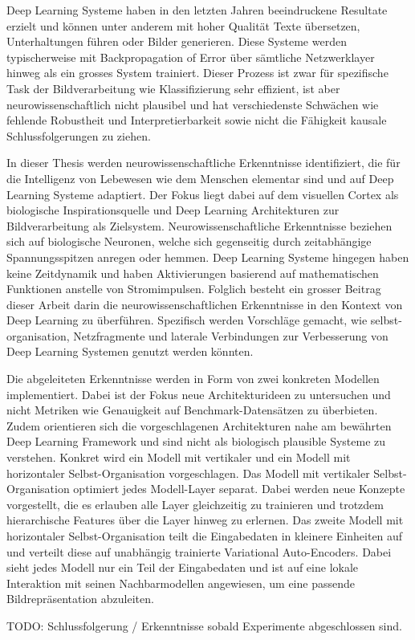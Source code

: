 Deep Learning Systeme haben in den letzten Jahren beeindruckene Resultate erzielt und können unter anderem mit hoher Qualität Texte übersetzen, Unterhaltungen führen oder Bilder generieren. Diese Systeme werden typischerweise mit Backpropagation of Error über sämtliche Netzwerklayer hinweg als ein grosses System trainiert. Dieser Prozess ist zwar für spezifische Task der Bildverarbeitung wie Klassifizierung sehr effizient, ist aber neurowissenschaftlich nicht plausibel und hat verschiedenste Schwächen wie fehlende Robustheit und Interpretierbarkeit sowie nicht die Fähigkeit kausale Schlussfolgerungen zu ziehen.

In dieser Thesis werden neurowissenschaftliche Erkenntnisse identifiziert, die für die Intelligenz von Lebewesen wie dem Menschen elementar sind und auf Deep Learning Systeme adaptiert. Der Fokus liegt dabei auf dem visuellen Cortex als biologische Inspirationsquelle und Deep Learning Architekturen zur Bildverarbeitung als Zielsystem. Neurowissenschaftliche Erkenntnisse beziehen sich auf biologische Neuronen, welche sich gegenseitig durch zeitabhängige Spannungsspitzen anregen oder hemmen. Deep Learning Systeme hingegen haben keine Zeitdynamik und haben Aktivierungen basierend auf mathematischen Funktionen anstelle von Stromimpulsen. Folglich besteht ein grosser Beitrag dieser Arbeit darin die neurowissenschaftlichen Erkenntnisse in den Kontext von Deep Learning zu überführen. Spezifisch werden Vorschläge gemacht, wie selbst-organisation, Netzfragmente und laterale Verbindungen zur Verbesserung von Deep Learning Systemen genutzt werden könnten.

Die abgeleiteten Erkenntnisse werden in Form von zwei konkreten Modellen implementiert. Dabei ist der Fokus neue Architekturideen zu untersuchen und nicht Metriken wie Genauigkeit auf Benchmark-Datensätzen zu überbieten. Zudem orientieren sich die vorgeschlagenen Architekturen nahe am bewährten Deep Learning Framework und sind nicht als biologisch plausible Systeme zu verstehen. Konkret wird ein Modell mit vertikaler und ein Modell mit horizontaler Selbst-Organisation vorgeschlagen. Das Modell mit vertikaler Selbst-Organisation optimiert jedes Modell-Layer separat. Dabei werden neue Konzepte vorgestellt, die es erlauben alle Layer gleichzeitig zu trainieren und trotzdem hierarchische Features über die Layer hinweg zu erlernen. Das zweite Modell mit horizontaler Selbst-Organisation teilt die Eingabedaten in kleinere Einheiten auf und verteilt diese auf unabhängig trainierte Variational Auto-Encoders. Dabei sieht jedes Modell nur ein Teil der Eingabedaten und ist auf eine lokale Interaktion mit seinen Nachbarmodellen angewiesen, um eine passende Bildrepräsentation abzuleiten.

TODO: Schlussfolgerung / Erkenntnisse sobald Experimente abgeschlossen sind.


